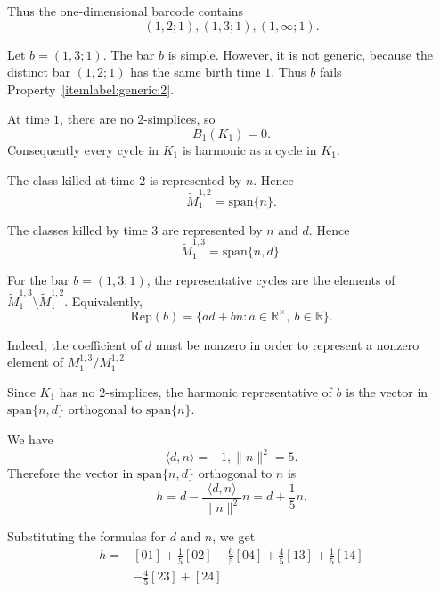 \documentclass[11pt]{amsart}
\theoremstyle{theorem}
\theoremstyle{remark}
\theoremstyle{definition}
\newcommand{\Rep}{\mathrm{Rep}}
\begin{document}
Thus the one-dimensional barcode contains
\[
(1,2;1),
(1,3;1),
(1,\infty;1).
\]

Let $b=(1,3;1)$.
The bar $b$ is simple. However, it is not generic, because the distinct bar
$
(1,2;1)
$
has the same birth time \(1\). Thus \(b\) 
fails 
Property~\eqref{itemlabel:generic:2}.


At time \(1\), there are no \(2\)-simplices, so
\[
B_1(K_1)=0.
\]
Consequently every cycle in \(K_1\) is harmonic as a cycle in \(K_1\).

The class killed at time \(2\) is represented by \(n\). Hence
\[
\widetilde{M}_1^{1,2}=\mathrm{span}\{n\}.
\]

The classes killed by time \(3\) are represented by \(n\) and \(d\). Hence
\[
\widetilde{M}_1^{1,3}=\mathrm{span}\{n,d\}.
\]

For the bar \(b=(1,3;1)\), the representative cycles are the elements of
$
\widetilde{M}_1^{1,3}\setminus \widetilde{M}_1^{1,2}
$.
Equivalently,
\[
\Rep(b)
=
\{a d+b n : a\in\mathbb{R}^\times,\ b\in\mathbb{R}\}.
\]

Indeed, the coefficient of \(d\) must be nonzero in order to represent a
nonzero element of
$
M_1^{1,3}/M_1^{1,2}
$


Since \(K_1\) has no \(2\)-simplices, the harmonic representative of \(b\) is
the vector in
$
\mathrm{span}\{n,d\}
$
orthogonal to
$
\mathrm{span}\{n\}
$.

We have
\[
\langle d,n\rangle=-1,
\|n\|^2=5.
\]
Therefore the vector in \(\mathrm{span}\{n,d\}\) orthogonal to \(n\) is
\[
h
=
d-\frac{\langle d,n\rangle}{\|n\|^2}n
=
d+\frac15 n.
\]

Substituting the formulas for \(d\) and \(n\), we get
\[
\begin{aligned}
h
={}&
[01]
+\frac15[02]
-\frac65[04]
+\frac45[13]
+\frac15[14] \\
&-\frac45[23]
+[24].
\end{aligned}
\]
\end{document}
